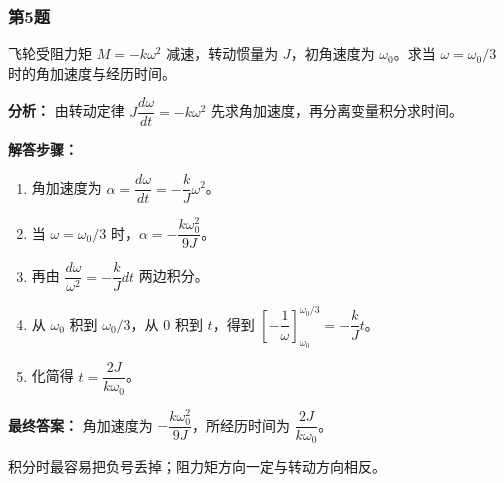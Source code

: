\documentclass[12pt,a4paper]{ctexart}
\begin{document}
\subsubsection*{第5题}
\begin{tcolorbox}[colback=gray!2!white,colframe=black!60,title={题目}]
飞轮受阻力矩 \(M=-k\omega^2\) 减速，转动惯量为 \(J\)，初角速度为 \(\omega_0\)。求当 \(\omega=\omega_0/3\) 时的角加速度与经历时间。\par
\end{tcolorbox}
\begin{tcolorbox}[colback=blue!2!white,colframe=blue!55!black,title={完整答案}]
\textbf{分析：}
由转动定律 \(J\dfrac{d\omega}{dt}=-k\omega^2\) 先求角加速度，再分离变量积分求时间。\par
\textbf{解答步骤：}
\begin{enumerate}
\item 角加速度为 \(\alpha=\dfrac{d\omega}{dt}=-\dfrac{k}{J}\omega^2\)。
\item 当 \(\omega=\omega_0/3\) 时，\(\alpha=-\dfrac{k\omega_0^2}{9J}\)。
\item 再由 \(\dfrac{d\omega}{\omega^2}=-\dfrac{k}{J}dt\) 两边积分。
\item 从 \(\omega_0\) 积到 \(\omega_0/3\)，从 0 积到 \(t\)，得到 \(\left[-\dfrac1\omega\right]_{\omega_0}^{\omega_0/3}=-\dfrac{k}{J}t\)。
\item 化简得 \(t=\dfrac{2J}{k\omega_0}\)。
\end{enumerate}
\textbf{最终答案：}
角加速度为 \(-\dfrac{k\omega_0^2}{9J}\)，所经历时间为 \(\dfrac{2J}{k\omega_0}\)。\par
\end{tcolorbox}
\begin{tcolorbox}[colback=red!2!white,colframe=red!55!black,title={易错点}]
积分时最容易把负号丢掉；阻力矩方向一定与转动方向相反。\par
\end{tcolorbox}
\end{document}
